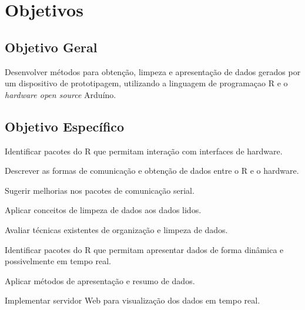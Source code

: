 \chapter[Objetivos]{Objetivos}

\section{Objetivo Geral}\label{sec-objetivoGeral}

Desenvolver métodos para obtenção, limpeza e apresentação de dados gerados por 
um dispositivo de prototipagem, utilizando a linguagem de programaçao R e o 
\emph{hardware open source} Arduíno.

\section{Objetivo Específico}\label{sec-objetivoEspecifico}

\begin{alineas}
  
  \item Identificar pacotes do R que permitam interação com interfaces de hardware.
  \item Descrever as formas de comunicação e obtenção de dados entre o R e o hardware.
  \item Sugerir melhorias nos pacotes de comunicação serial.
  \item Aplicar conceitos de limpeza de dados aos dados lidos.
  \item Avaliar técnicas existentes de organização e limpeza de dados.
  \item Identificar pacotes do R que permitam apresentar dados de forma dinâmica e 
  possivelmente em tempo real.
  \item Aplicar métodos de apresentação e resumo de dados.
  \item Implementar servidor Web para visualização dos dados em tempo real.
  
\end{alineas}